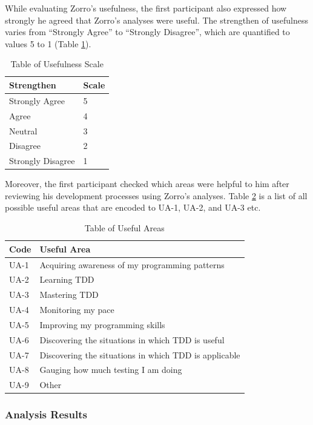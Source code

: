 While evaluating Zorro's usefulness, the first participant also
expressed how strongly he agreed that Zorro's analyses were
useful. The strengthen of usefulness varies from ``Strongly Agree'' to
``Strongly Disagree'', which are quantified to values 5 to 1 (Table
\ref{tab:UsefulnessScale}).
\begin{table}[!h]
\centering
  \begin{tabular}{|l|l|}
  \hline
   Strengthen        & Scale \\ \hline
   Strongly Agree    & 5 \\ \hline
   Agree             & 4 \\ \hline
   Neutral           & 3 \\ \hline
   Disagree          & 2 \\ \hline
   Strongly Disagree & 1 \\ \hline
  \end{tabular}
  \caption{Table of Usefulness Scale}\label{tab:UsefulnessScale}  
\end{table}

Moreover, the first participant checked which areas were helpful to
him after reviewing his development processes using Zorro's
analyses. Table \ref{tab:UsefulAreas} is a list of all possible useful
areas that are encoded to UA-1, UA-2, and UA-3 etc.
\begin{table}[!h]
  \centering
  \begin{tabular}{|l|l|}
  \hline
  Code & Useful Area \\ \hline
  UA-1 & Acquiring awareness of my programming patterns \\ \hline
  UA-2 & Learning TDD \\ \hline
  UA-3 & Mastering TDD \\ \hline
  UA-4 & Monitoring my pace \\ \hline
  UA-5 & Improving my programming skills \\ \hline
  UA-6 & Discovering the situations in which TDD is useful \\ \hline
  UA-7 & Discovering the situations in which TDD is applicable \\ \hline
  UA-8 & Gauging how much testing I am doing \\ \hline
  UA-9 & Other \\ \hline
  \end{tabular}
  \caption{Table of Useful Areas}\label{tab:UsefulAreas}  
\end{table}

\subsubsection{Analysis Results}

